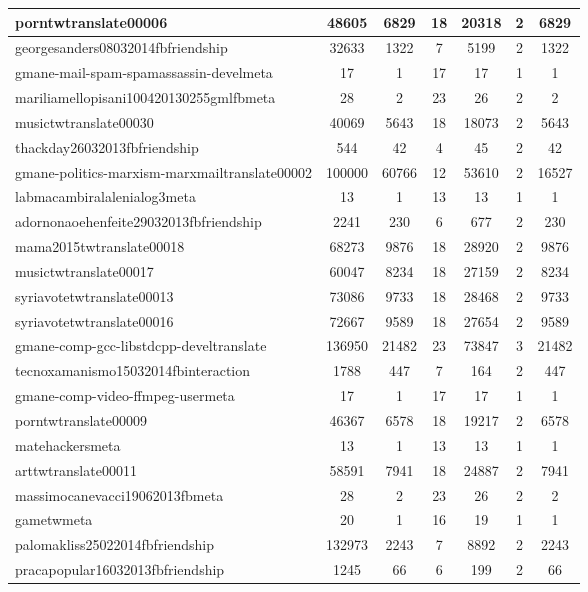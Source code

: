 \begin{table*}[h!]
\begin{center}
\begin{tabular}{| l | c | c | c | c | c | c |}
porntwtranslate00006 & 48605  & 6829  & 18  & 20318  & 2  & 6829 \\\hline
georgesanders08032014fbfriendship & 32633  & 1322  & 7  & 5199  & 2  & 1322 \\\hline
gmane-mail-spam-spamassassin-develmeta & 17  & 1  & 17  & 17  & 1  & 1 \\\hline
mariliamellopisani100420130255gmlfbmeta & 28  & 2  & 23  & 26  & 2  & 2 \\\hline
musictwtranslate00030 & 40069  & 5643  & 18  & 18073  & 2  & 5643 \\\hline
thackday26032013fbfriendship & 544  & 42  & 4  & 45  & 2  & 42 \\\hline
gmane-politics-marxism-marxmailtranslate00002 & 100000  & 60766  & 12  & 53610  & 2  & 16527 \\\hline
labmacambiralalenialog3meta & 13  & 1  & 13  & 13  & 1  & 1 \\\hline
adornonaoehenfeite29032013fbfriendship & 2241  & 230  & 6  & 677  & 2  & 230 \\\hline
mama2015twtranslate00018 & 68273  & 9876  & 18  & 28920  & 2  & 9876 \\\hline
musictwtranslate00017 & 60047  & 8234  & 18  & 27159  & 2  & 8234 \\\hline
syriavotetwtranslate00013 & 73086  & 9733  & 18  & 28468  & 2  & 9733 \\\hline
syriavotetwtranslate00016 & 72667  & 9589  & 18  & 27654  & 2  & 9589 \\\hline
gmane-comp-gcc-libstdcpp-develtranslate & 136950  & 21482  & 23  & 73847  & 3  & 21482 \\\hline
tecnoxamanismo15032014fbinteraction & 1788  & 447  & 7  & 164  & 2  & 447 \\\hline
gmane-comp-video-ffmpeg-usermeta & 17  & 1  & 17  & 17  & 1  & 1 \\\hline
porntwtranslate00009 & 46367  & 6578  & 18  & 19217  & 2  & 6578 \\\hline
matehackersmeta & 13  & 1  & 13  & 13  & 1  & 1 \\\hline
arttwtranslate00011 & 58591  & 7941  & 18  & 24887  & 2  & 7941 \\\hline
massimocanevacci19062013fbmeta & 28  & 2  & 23  & 26  & 2  & 2 \\\hline
gametwmeta & 20  & 1  & 16  & 19  & 1  & 1 \\\hline
palomakliss25022014fbfriendship & 132973  & 2243  & 7  & 8892  & 2  & 2243 \\\hline
pracapopular16032013fbfriendship & 1245  & 66  & 6  & 199  & 2  & 66 \\\hline

\end{tabular}
\end{center}
\end{table*}
